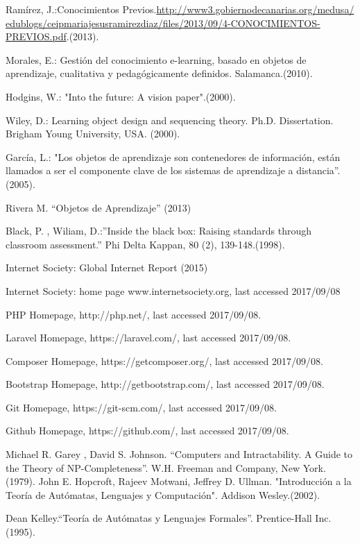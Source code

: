 \documentclass{llncs}
\begin{document}
%

%
\begin{thebibliography}{5}
%

Ramírez, J.:Conocimientos Previos.\url{http://www3.gobiernodecanarias.org/medusa/
edublogs/ceipmariajesusramirezdiaz/files/2013/09/4-CONOCIMIENTOS-PREVIOS.pdf}.(2013).

Morales, E.:
Gestión del conocimiento e-learning, basado en objetos de aprendizaje, cualitativa y pedagógicamente definidos.
Salamanca.(2010).

Hodgins, W.:
"Into the future: A vision paper".(2000).

Wiley, D.:
Learning object design and sequencing theory. Ph.D. Dissertation.
Brigham Young University, USA. (2000).

García, L.:
"Los objetos de aprendizaje son contenedores de información, están llamados a ser el componente clave de los sistemas de aprendizaje a distancia”.(2005).

Rivera M. “Objetos de Aprendizaje” (2013)

Black, P. , Wiliam, D.:”Inside the black box: Raising standards through classroom assessment.” Phi Delta Kappan, 80 (2), 139-148.(1998).

Internet Society: Global Internet Report (2015)

Internet Society: home page www.internetsociety.org, last accessed 2017/09/08


PHP Homepage, http://php.net/, last accessed 2017/09/08.

Laravel Homepage, https://laravel.com/, last accessed 2017/09/08.

Composer Homepage, https://getcomposer.org/, last accessed 2017/09/08.

Bootstrap Homepage, http://getbootstrap.com/, last accessed 2017/09/08.

Git Homepage, https://git-scm.com/, last accessed 2017/09/08.

Github Homepage, https://github.com/, last accessed 2017/09/08.

Michael R. Garey , David S. Johnson. “Computers and Intractability. A Guide to         the Theory of NP-Completeness”. W.H. Freeman and Company, New York.(1979).
John E. Hopcroft, Rajeev Motwani, Jeffrey D. Ullman. "Introducción a la Teoría de Autómatas, Lenguajes y Computación".  Addison Wesley.(2002).

Dean Kelley.“Teoría de Autómatas y Lenguajes Formales”. Prentice-Hall Inc.(1995).



\end{thebibliography}
\end{document}
